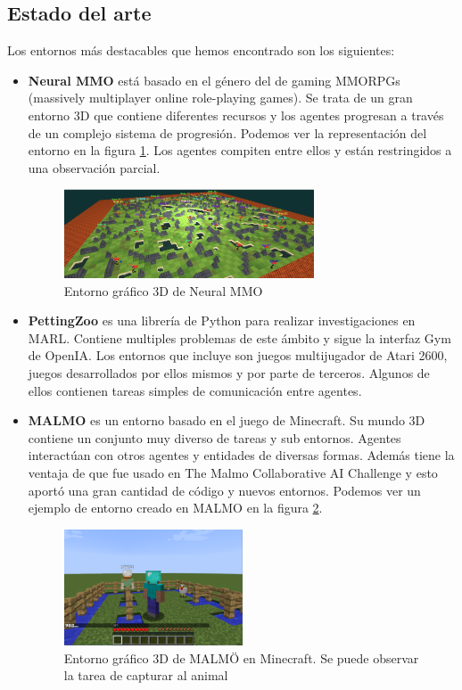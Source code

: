 \subsection{Estado del arte}

Los entornos más destacables que hemos encontrado son los siguientes:
\begin{itemize}
    \item \textbf{Neural MMO} está basado en el género del de gaming MMORPGs (massively multiplayer online role-playing games). Se trata de un gran entorno 3D que contiene diferentes recursos  y los agentes progresan a través de un complejo sistema de progresión. Podemos ver la representación del entorno en la figura \ref{fig:neural-mmo}. Los agentes compiten entre ellos y están restringidos a una observación parcial. \cite{env-list} 
        \begin{figure}[ht]
            \centering
            \includegraphics[width=0.7\textwidth]{img/neural-mmo.png}
            \caption{Entorno gráfico 3D de Neural MMO \cite{neural-mmo}}
            \label{fig:neural-mmo}
        \end{figure}
    \item \textbf{PettingZoo} es una librería de Python para realizar investigaciones en MARL. Contiene multiples problemas de este ámbito y sigue la interfaz Gym de OpenIA. Los entornos que incluye son juegos multijugador de Atari 2600, juegos desarrollados por ellos mismos y por parte de terceros. Algunos de ellos contienen tareas simples de comunicación entre agentes.\cite{env-list}
    \item \textbf{MALMO} es un entorno basado en el juego de Minecraft. Su mundo 3D contiene un conjunto muy diverso de tareas y sub entornos. Agentes interactúan con otros agentes y entidades de diversas formas. Además tiene la ventaja de que fue usado en The Malmo Collaborative AI Challenge y esto aportó una gran cantidad de código y nuevos entornos. \cite{env-list} Podemos ver un ejemplo de entorno creado en MALMO en la figura \ref{fig:mob-chase}.
        \begin{figure}[ht]
            \centering
            \includegraphics[width=0.5\textwidth]{img/mobchase.png}
            \caption{Entorno gráfico 3D de MALMÖ en Minecraft. Se puede observar la tarea de capturar al animal \cite{malmo}}
            \label{fig:mob-chase}
        \end{figure}
        

\end{itemize}
